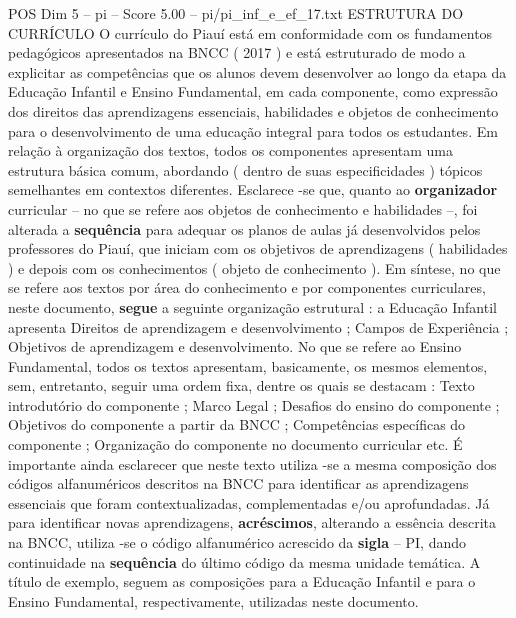 \begin{textsample}{POS Dim 5 – pi – Score 5.00 – pi/pi\_inf\_e\_ef\_17.txt}  \label{ex:f5_pos_235}
ESTRUTURA DO CURRÍCULO O currículo do Piauí está em conformidade com os fundamentos pedagógicos apresentados na BNCC ( 2017 ) e está estruturado de modo a explicitar as competências que os alunos devem desenvolver ao longo da etapa da Educação Infantil e Ensino Fundamental, em cada componente, como expressão dos direitos das aprendizagens essenciais, habilidades e objetos de conhecimento para o desenvolvimento de uma educação integral para todos os estudantes.
Em relação à organização dos textos, todos os componentes apresentam uma estrutura básica comum, abordando ( dentro de suas especificidades ) tópicos semelhantes em contextos diferentes.
Esclarece -se que, quanto ao \textbf{organizador} curricular – no que se refere aos objetos de conhecimento e habilidades –, foi alterada a \textbf{sequência} para adequar os planos de aulas já desenvolvidos pelos professores do Piauí, que iniciam com os objetivos de aprendizagens ( habilidades ) e depois com os conhecimentos ( objeto de conhecimento ).
Em síntese, no que se refere aos textos por área do conhecimento e por componentes curriculares, neste documento, \textbf{segue} a seguinte organização estrutural : a Educação Infantil apresenta Direitos de aprendizagem e desenvolvimento ; Campos de Experiência ; Objetivos de aprendizagem e desenvolvimento.
No que se refere ao Ensino Fundamental, todos os textos apresentam, basicamente, os mesmos elementos, sem, entretanto, seguir uma ordem fixa, dentre os quais se destacam : Texto introdutório do componente ; Marco Legal ; Desafios do ensino do componente ; Objetivos do componente a partir da BNCC ; Competências específicas do componente ; Organização do componente no documento curricular etc.
É importante ainda esclarecer que neste texto utiliza -se a mesma composição dos códigos alfanuméricos descritos na BNCC para identificar as aprendizagens essenciais que foram contextualizadas, complementadas e/ou aprofundadas.
Já para identificar novas aprendizagens, \textbf{acréscimos}, alterando a essência descrita na BNCC, utiliza -se o código alfanumérico acrescido da \textbf{sigla} – PI, dando continuidade na \textbf{sequência} do último código da mesma unidade temática.
A título de exemplo, seguem as composições para a Educação Infantil e para o Ensino Fundamental, respectivamente, utilizadas neste documento.

\end{textsample}
